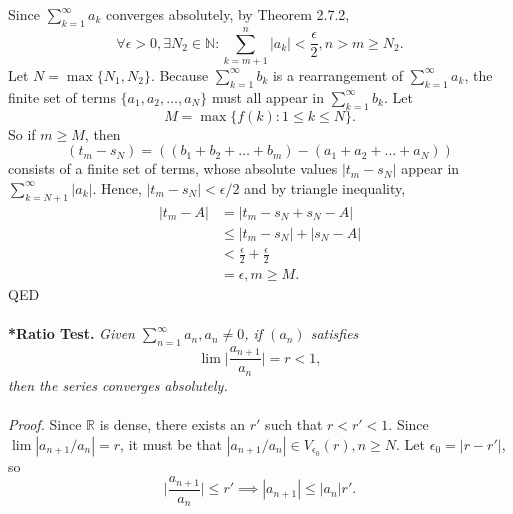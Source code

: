 \documentclass{article}
\begin{document}
            Since $\sum_{k=1}^\infty a_k$ converges absolutely, by Theorem 2.7.2, 
            \begin{equation*}
                \forall \epsilon > 0, \exists N_2 \in \mathbb{N}: \sum_{k=m+1}^n |a_k| < \frac{\epsilon}{2}, n>m \geq N_2.
            \end{equation*}
            Let $N=\max \{N_1,N_2\}$. Because $\sum_{k=1}^\infty b_k$ is a rearrangement of $\sum_{k=1}^\infty a_k$, the finite set of terms $\{a_1,a_2,\dots,a_N\}$ must all appear in $\sum_{k=1}^\infty b_k$. Let
            \begin{equation*}
                M = \max \{f(k): 1 \leq k \leq N\}.
            \end{equation*}
            So if $m \geq M$, then
            \begin{equation*}
                (t_m - s_N) = ((b_1+b_2+\dots+b_m)-(a_1+a_2+\dots+a_N))
            \end{equation*}
            consists of a finite set of terms, whose absolute values $|t_m - s_N|$ appear in $\sum_{k=N+1}^\infty |a_k|$. Hence, $|t_m - s_N| < \epsilon/2$ and by triangle inequality,
            \begin{align*}
                |t_m-A| & = |t_m-s_N+s_N-A| \\
                & \leq |t_m-s_N| + |s_N-A| \\
                & < \frac{\epsilon}{2} + \frac{\epsilon}{2} \\
                & = \epsilon, m \geq M.
            \end{align*}
            QED
            \\ \\
            \textbf{*Ratio Test.} \textit{Given $\sum_{n=1}^\infty a_n,a_n \neq 0$, if $(a_n)$ satisfies}
            \begin{equation*}
                \lim \bigg|\frac{a_{n+1}}{a_n}\bigg|=r<1,
            \end{equation*}
            \textit{then the series converges absolutely.}\\ \\
            \textit{Proof.} Since $\mathbb{R}$ is dense, there exists an $r'$ such that $r<r'<1$. Since $\lim|a_{n+1}/a_n|=r$, it must be that $|a_{n+1}/a_n|\in V_{\epsilon_0}(r), n \geq N.$ Let $\epsilon_0=|r-r'|$, so 
            \begin{equation*}
                \bigg|\frac{a_{n+1}}{a_n}\bigg| \leq r' \implies |a_{n+1}| \leq |a_n|r'.
            \end{equation*}
\end{document}

